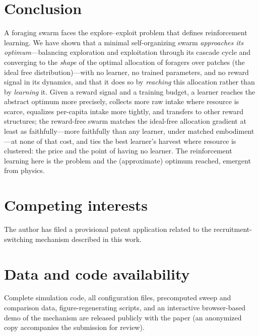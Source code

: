 \documentclass{article}
\newif\ifanon
\begin{document}
\section{Conclusion}
A foraging swarm faces the explore--exploit problem that defines reinforcement learning. We have shown that a
minimal self-organizing swarm \emph{approaches its optimum}---balancing exploration and exploitation
through its cascade cycle and converging to the \emph{shape} of the optimal allocation of foragers over patches
(the ideal free distribution)---with no learner, no trained parameters, and no reward signal in its dynamics,
and that it does so by \emph{reaching} this allocation rather than by \emph{learning} it. Given a reward signal
and a training budget, a learner reaches the abstract optimum more precisely, collects more raw intake where
resource is scarce, equalizes per-capita intake more tightly, and transfers to other reward structures; the
reward-free swarm matches the ideal-free allocation gradient at least as faithfully---more faithfully than any
learner, under matched embodiment---at none of that cost, and ties the best learner's harvest where resource is
clustered: the price and the point of having no learner. The
reinforcement learning here is the problem and the (approximate) optimum reached, emergent from physics.

\section*{Competing interests}
\ifanon
Omitted for anonymized review; competing interests are declared in the submission metadata and will be stated
in the camera-ready version.
\else
The author has filed a provisional patent application related to the recruitment-switching mechanism described
in this work.
\fi

\section*{Data and code availability}
\ifanon
To support reproducibility and self-containedness, an \emph{anonymized} repository containing the complete
simulation code, all configuration files, precomputed sweep and comparison data, the figure-regenerating
scripts, and an interactive browser-based demo of the mechanism accompanies this submission for review. The
de-anonymized repository and the publicly hosted, runnable demo are released publicly upon publication.
\else
Complete simulation code, all configuration files, precomputed sweep and comparison data, figure-regenerating
scripts, and an interactive browser-based demo of the mechanism are released publicly with the paper (an
anonymized copy accompanies the submission for review).
\fi
\end{document}
